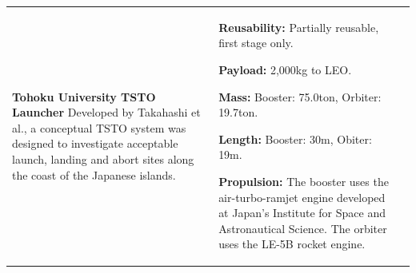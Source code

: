 {\begin{landscape}
\begin{xltabular}{\linewidth}{|X|X|X|}
	\\
	\hline \small 
	\textbf{Tohoku University TSTO Launcher}\cite{Takahashi1997}\newline\newline
	Developed by Takahashi et al.\cite{Takahashi1997}, a conceptual TSTO system was designed to investigate acceptable launch, landing and abort sites along the coast of the Japanese islands. 
	&\small
	
	\textbf{Reusability:} Partially reusable, first stage only. 
	
	\textbf{Payload:} 2,000kg to LEO. 
	
	\textbf{Mass:} Booster: 75.0ton, Orbiter: 19.7ton.
	
	\textbf{Length:} Booster: 30m,  Obiter: 19m.
	
	\textbf{Propulsion:} The booster uses the air-turbo-ramjet engine developed at Japan's Institute for Space and Astronautical Science. The orbiter uses the LE-5B rocket engine. 
	

\end{xltabular}
\end{landscape}}
